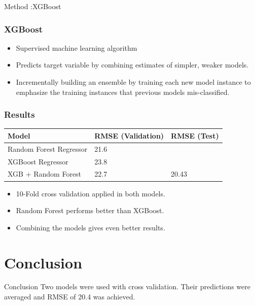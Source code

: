 \documentclass[11pt]{beamer}
\begin{document}
		\begin{frame}{Method :XGBoost}
	\frametitle{XGBoost}
	
\begin{itemize}
	\item Supervised machine learning algorithm
	\item Predicts target variable by combining estimates of simpler, weaker models.
	\item Incrementally building an ensemble by training each new
	model instance to emphasize the training instances that previous models mis-classified.
\end{itemize}	
	
\end{frame}	
		\begin{frame}
		\frametitle{Results}

		\begin{table}[]
			\begin{tabular}{lll}
				\hline
				\textbf{Model}          & \textbf{RMSE (Validation)} & \textbf{RMSE (Test)} \\ \hline
				Random Forest Regressor & 21.6                       &                      \\
				XGBoost Regressor       & 23.8                       &                      \\
				XGB + Random Forest     & 22.7                       & 20.43                \\ \hline
			\end{tabular}
		\end{table}
	\begin{itemize}
		\item 10-Fold cross validation applied in both models.
		\item Random Forest performs better than XGBoost.
		\item Combining the models gives even better results. 
	\end{itemize}
	\end{frame}
			
	\section{Conclusion}
	
		\begin{frame}{}
		
			\begin{block}{Conclusion}
			Two models were used with cross validation. Their predictions were averaged and RMSE of 20.4 was achieved.
			\end{block}
		\end{frame}
	
\end{document}
